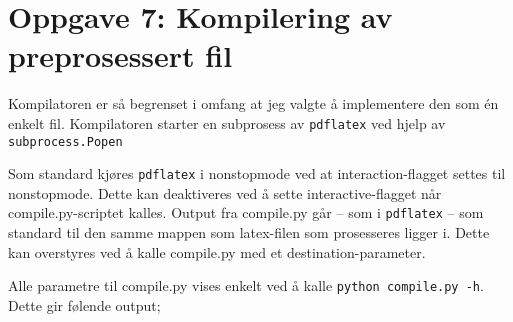 \section*{Oppgave 7: Kompilering av preprosessert fil}

Kompilatoren er så begrenset i omfang at jeg valgte å implementere den som én enkelt fil. Kompilatoren starter en subprosess av \verb;pdflatex; ved hjelp av \verb;subprocess.Popen;

Som standard kjøres \verb;pdflatex; i nonstopmode ved at interaction-flagget settes til nonstopmode. Dette kan deaktiveres ved å sette interactive-flagget når compile.py-scriptet kalles.
Output fra compile.py går – som i \verb;pdflatex; – som standard til den samme mappen som latex-filen som prosesseres ligger i. Dette kan overstyres ved å kalle compile.py med et destination-parameter.

Alle parametre til compile.py vises enkelt ved å kalle \verb;python compile.py -h;. Dette gir følende output;

